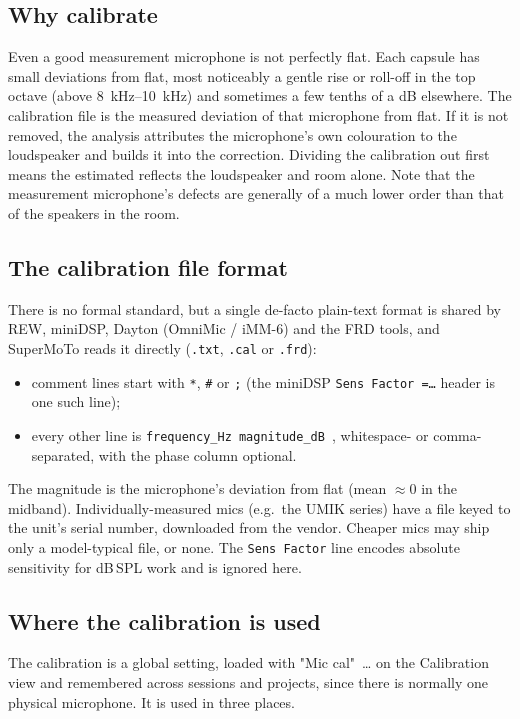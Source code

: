 \subsection{Why calibrate}
Even a good measurement microphone is not perfectly flat. Each capsule has small deviations from flat, most noticeably a gentle rise or roll-off in the top octave (above \SIrange{8}{10}{\kilo\hertz}) and sometimes a few tenths of a dB elsewhere. The calibration file is the measured deviation of that microphone from flat. If it is not removed, the analysis attributes the microphone's own colouration to the loudspeaker and builds it into the correction. Dividing the calibration out first means the estimated  reflects the loudspeaker and room alone. Note that the measurement microphone's defects are generally of a much lower order than that of the speakers in the room.

\subsection{The calibration file format}
There is no formal standard, but a single de-facto plain-text format is shared by REW, miniDSP, Dayton (OmniMic / iMM-6) and the FRD tools, and SuperMoTo reads it directly (\texttt{.txt}, \texttt{.cal} or \texttt{.frd}):

\begin{itemize}[nosep]
  \item comment lines start with \texttt{*}, \texttt{\#} or \texttt{;} (the miniDSP \texttt{Sens Factor =\ldots} header is one such line);
  \item every other line is \texttt{frequency\_Hz \quad magnitude\_dB }, whitespace- or comma-separated, with the phase column optional.
\end{itemize}

The magnitude is the microphone's deviation from flat (mean $\approx 0$ in the midband). Individually-measured mics (e.g.\ the UMIK series) have a file keyed to the unit's serial number, downloaded from the vendor. Cheaper mics may ship only a model-typical file, or none. The \texttt{Sens Factor} line encodes absolute sensitivity for dB\,SPL work and is ignored here.

\subsection{Where the calibration is used}
The calibration is a global setting, loaded with "Mic cal"~\ldots{} on the Calibration view and remembered across sessions and projects, since there is normally one physical microphone. It is used in three places.

